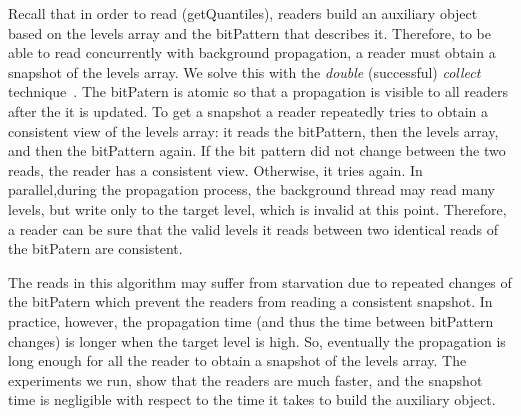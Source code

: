 Recall that in order to read (getQuantiles), readers build an
auxiliary object based on the levels array and the bitPattern
that describes it.
Therefore, to be able to read concurrently with
background propagation, a reader must obtain a snapshot of the
levels array.
We solve this with the \emph{double} (successful) \emph{collect} technique~\cite{}.
The bitPatern is atomic so
that a propagation is visible to all readers after the
it is updated.
To get a snapshot a reader repeatedly tries to obtain a consistent view of
the levels array: it reads the bitPattern, then the levels array,
and then the bitPattern again.
If the bit pattern did not change between the two reads, the
reader has a consistent view.
Otherwise, it tries again.
In parallel,during the propagation process, the background
thread may read many levels, but write only to the target level,
which is invalid at this point.
Therefore, a reader can be sure that the valid levels it reads
between two identical reads of the bitPatern are consistent.

The reads in this algorithm may suffer from starvation due to repeated changes of the bitPatern which prevent the readers from reading a consistent snapshot.
In practice, however, the propagation time (and thus
the time between bitPattern changes) is longer when the target
level is high.
So, eventually the propagation is long enough for
all the reader to obtain a snapshot of the levels array. 
The experiments we run, show that the readers are 
much faster, and the snapshot time is negligible with respect to the time it takes to
build the auxiliary object.

